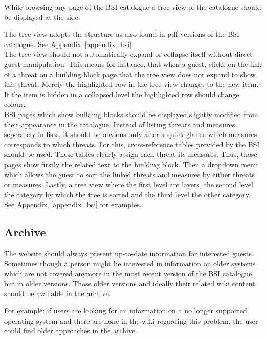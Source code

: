 While browsing any page of the BSI catalogue a tree view of the catalogue should be displayed at the side.
\bigskip

\begin{tcolorbox}[breakable,colback=red!10,colframe=red!40!black,title=UPDATE 13/11/2017]
The tree view adopts the structure as also found in pdf versions of the BSI catalogue. 
See Appendix~\ref{appendix_bsi}.\\
The tree view should not automatically expand or collapse itself without direct guest manipulation.
This means for instance, that when a guest, clicks on the link of a threat on a building block page that the tree view does not expand to show this threat.
Merely the highlighted row in the tree view changes to the new item.
If the item is hidden in a collapsed level the highlighted row should change colour.
\\
BSI pages which show building blocks should be displayed slightly modified from their appearance in the catalogue.
Instead of listing threats and measures seperately in lists, it should be obvious only after a quick glance which measures corresponds to which threats.
For this, cross-reference tables provided by the BSI should be used.
These tables clearly assign each threat its measures.
Thus, those pages show firstly the related text to the building block.
Then a dropdown menu which allows the guest to sort the linked threats and measures by either threats or measures.
Lastly, a tree view where the first level are layers, the second level the category by which the tree is sorted and the third level the other category.
See Appendix~\ref{appendix_bsi} for examples.
\end{tcolorbox}


\subsection{Archive} 
\label{archive}
The website should always present up-to-date information for interested guests.
Sometimes though a person might be interested in information on older systems which are not covered anymore in the most recent version of the BSI catalogue but in older versions.
Those older versions and ideally their related wiki content should be available in the archive. 

For example: if users are looking for an information on a no longer supported operating system and there are none in the wiki regarding this problem, the user could find older approaches in the archive. 

